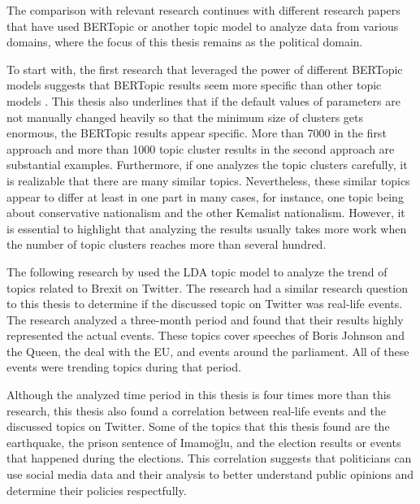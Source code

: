 The comparison with relevant research continues with different research papers that have used BERTopic 
or another topic model to analyze data from various domains, where the focus of this thesis remains 
as the political domain. 

To start with, the first research that leveraged the power of different BERTopic models suggests that 
BERTopic results seem more specific than other topic models 
\parencite{topic_model_comparison_bertopic_2022}. This thesis also underlines that if the default 
values of parameters are not manually changed heavily so that the minimum size of clusters gets 
enormous, the BERTopic results appear specific. More than 7000 in the first approach and more than 
1000 topic cluster results in the second approach are substantial examples. Furthermore, if one 
analyzes the topic clusters carefully, it is realizable that there are many similar topics. 
Nevertheless, these similar topics appear to differ at least in one part in many cases, for instance, 
one topic being about conservative nationalism and the other Kemalist nationalism. However, it is 
essential to highlight that analyzing the results usually takes more work when the number of topic 
clusters reaches more than several hundred.

The following research by \textcite{ilyas_brexit_topic_modeling_2020} used the LDA topic model to 
analyze the trend of topics related to Brexit on Twitter. The research had a similar research question 
to this thesis to determine if the discussed topic on Twitter was real-life events. The research 
analyzed a three-month period and found that their results highly represented the actual events. 
These topics cover speeches of Boris Johnson and the Queen, the deal with the EU, and events around 
the parliament. All of these events were trending topics during that period. 

Although the analyzed time period in this thesis is four times more than this research, this thesis 
also found a correlation between real-life events and the discussed topics on Twitter. Some of the 
topics that this thesis found are the earthquake, the prison sentence of Imamoğlu, and the election 
results or events that happened during the elections. This correlation suggests that politicians 
can use social media data and their analysis to better understand public opinions and determine 
their policies respectfully.

